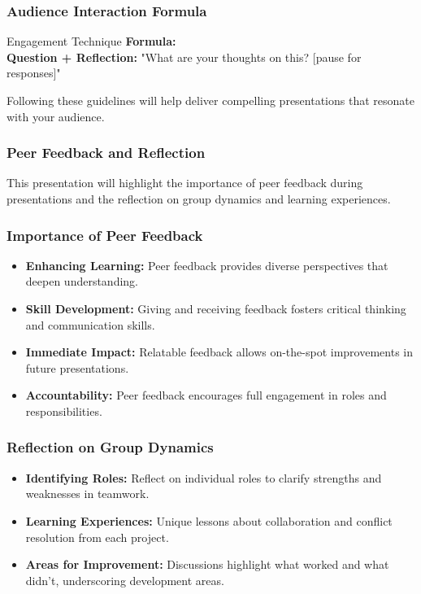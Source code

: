 \documentclass[aspectratio=169]{beamer}
\begin{document}
\begin{frame}[fragile]
    \frametitle{Audience Interaction Formula}
    \begin{block}{Engagement Technique}
        \textbf{Formula:} \\
        \textbf{Question + Reflection:} "What are your thoughts on this? [pause for responses]"
    \end{block}
    Following these guidelines will help deliver compelling presentations that resonate with your audience.
\end{frame}

\begin{frame}[fragile]
    \frametitle{Peer Feedback and Reflection}
    This presentation will highlight the importance of peer feedback during presentations and the reflection on group dynamics and learning experiences.
\end{frame}

\begin{frame}[fragile]
    \frametitle{Importance of Peer Feedback}
    \begin{itemize}
        \item \textbf{Enhancing Learning:} Peer feedback provides diverse perspectives that deepen understanding.
        \item \textbf{Skill Development:} Giving and receiving feedback fosters critical thinking and communication skills.
        \item \textbf{Immediate Impact:} Relatable feedback allows on-the-spot improvements in future presentations.
        \item \textbf{Accountability:} Peer feedback encourages full engagement in roles and responsibilities.
    \end{itemize}
\end{frame}

\begin{frame}[fragile]
    \frametitle{Reflection on Group Dynamics}
    \begin{itemize}
        \item \textbf{Identifying Roles:} Reflect on individual roles to clarify strengths and weaknesses in teamwork.
        \item \textbf{Learning Experiences:} Unique lessons about collaboration and conflict resolution from each project.
        \item \textbf{Areas for Improvement:} Discussions highlight what worked and what didn't, underscoring development areas.
    \end{itemize}
\end{frame}
\end{document}
